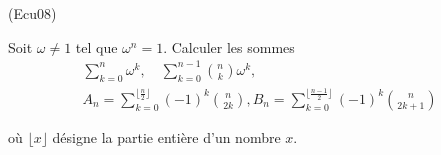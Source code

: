 \begin{tiny}(Ecu08)\end{tiny}
Soit $\omega \neq 1$ tel que $\omega ^{n}=1$. Calculer les sommes
\begin{multline*}
\sum_{k=0}^{n}\omega ^{k},\quad \sum_{k=0}^{n-1}\binom{n}{k}\omega ^{k},\\ 
A_{n} = \sum_{k=0}^{\lfloor\frac{n}{2}\rfloor}(-1)^{k}\binom{n}{2k}, 
B_{n} = \sum_{k=0}^{\lfloor\frac{n-1}{2}\rfloor}(-1)^{k}\binom{n}{2k+1}
\end{multline*}

où $\lfloor x\rfloor$ désigne la partie entière d'un nombre $x$.
